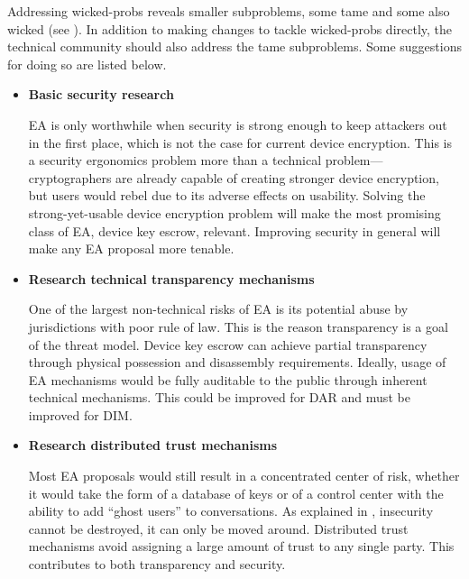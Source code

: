 Addressing \acp{wicked-prob} reveals smaller subproblems, some tame and some also wicked (see
). In addition to making changes to tackle \acp{wicked-prob} directly, the technical
community should also address the tame subproblems. Some suggestions for doing so are listed below.

\newcommand{\taskstart}[0]{\begin{itemize}}
\newcommand{\taskitem}[2]{ %
    \item \textbf{#1} \nopagebreak

    \vspace{0.5\baselineskip} \parbox{\linewidth}{#2} \vspace{0.5\baselineskip}
}
\newcommand{\taskend}{\end{itemize}}

\taskstart
    \taskitem{Basic security research}{

\ac{EA} is only worthwhile when security is strong enough to keep attackers out in the first place, which is not the
case for current device encryption. This is a security ergonomics problem more than a technical problem---cryptographers
are already capable of creating stronger device encryption, but users would rebel due to its adverse effects on
usability. Solving the strong-yet-usable device encryption problem will make the most promising class of \ac{EA}, device
key escrow, relevant. Improving security in general will make any \ac{EA} proposal more tenable.

}

    \taskitem{Research technical transparency mechanisms}{

One of the largest non-technical risks of \ac{EA} is its potential abuse by jurisdictions with poor rule of law. This is
the reason transparency is a goal of the threat model. Device key escrow can achieve partial transparency through
physical possession and disassembly requirements. Ideally, usage of \ac{EA} mechanisms would be fully auditable to the
public through inherent technical mechanisms. This could be improved for \acl{DAR} and must be improved for \acl{DIM}.

}

    \taskitem{Research distributed trust mechanisms}{

Most \ac{EA} proposals would still result in a concentrated center of risk, whether it would take the form of a database
of keys or of a control center with the ability to add ``ghost users'' to conversations. As explained in
\mysec{sec-premises}, insecurity cannot be destroyed, it can only be moved around. Distributed trust mechanisms avoid
assigning a large amount of trust to any single party. This contributes to both transparency and security.

}
\taskend

